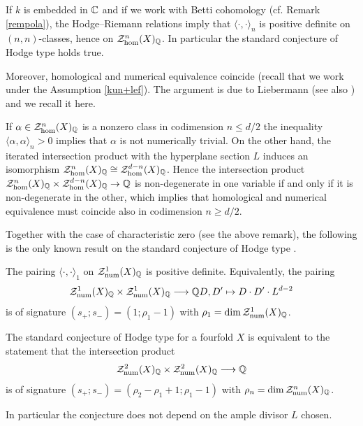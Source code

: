 \begin{remark}
\notready\label{remHR}
If $k$ is embedded in $\mathbb{C}$ and if we work with Betti cohomology (cf. Remark \ref{rempola}), the Hodge--Riemann relations imply that $\langle \cdot, \cdot \rangle_{n}$  is positive definite on $(n,n)$-classes, hence on $\mathcal{Z}_{\hom}^{n}(X)_{\mathbb{Q}}$. In particular the standard conjecture of Hodge type holds true.

Moreover, homological and numerical equivalence coincide (recall that we work under the Assumption  \ref{kun+lef}). The argument is due to Liebermann  \cite{Lieb} (see also \cite[Corollary 5.4.2.2]{Andmot}) and we recall it here.

If  $\alpha \in \mathcal{Z}_{\hom}^{n}(X)_{\mathbb{Q}}$ is a nonzero class  in codimension $n\leq d/2$ the inequality  $\langle \alpha, \alpha \rangle_{n}>0$ implies that $\alpha$ is not numerically trivial. On the other hand, the iterated intersection product with the hyperplane section $L$ induces an isomorphism $\mathcal{Z}_{\hom}^{n}(X)_{\mathbb{Q}}\cong \mathcal{Z}_{\hom}^{d-n}(X)_{\mathbb{Q}}$. Hence the intersection product $\mathcal{Z}_{\hom}^{n}(X)_{\mathbb{Q}}\times \mathcal{Z}_{\hom}^{d-n}(X)_{\mathbb{Q}}\rightarrow \mathbb{Q}$ is non-degenerate in one variable if and only if it is non-degenerate in the other, which implies that homological and numerical equivalence must coincide also in codimension $n\geq d/2$.

\end{remark}
Together with the case of characteristic zero (see the above remark), the following is the only known result on the standard conjecture of Hodge type \cite[5.3.2.3]{Andmot}.
\begin{theorem}
\notready
The pairing\label{segre} $\langle \cdot, \cdot \rangle_{1}$   on $\mathcal{Z}_{\mathrm{num}}^{1}(X)_{\mathbb{Q}}$ is positive definite. Equivalently, the pairing
\[\mathcal{Z}^1_{\mathrm{num}}(X)_{\mathbb{Q}}\times \mathcal{Z}_{\mathrm{num}}^1(X)_{\mathbb{Q}} \longrightarrow \mathbb{Q}  D,D' \mapsto D\cdot D' \cdot L^{d-2}\]
is of signature  $ (s_+;s_-) = (1;  \rho_1-1)$ with
 $\rho_1=\dim \mathcal{Z}_{\mathrm{num}}^1(X)_{\mathbb{Q}}$.
\end{theorem}
\begin{prop}
\notready\label{anypolarization}
The standard conjecture of Hodge type for a fourfold $X$  is equivalent to the statement that the intersection product
\[\mathcal{Z}^2_{\mathrm{num}}(X)_{\mathbb{Q}}\times \mathcal{Z}_{\mathrm{num}}^2(X)_{\mathbb{Q}} \longrightarrow \mathbb{Q}\]
is of signature  $ (s_+;s_-) = ( \rho_2 - \rho_1+1;  \rho_1-1)$ with
 $\rho_n=\dim \mathcal{Z}_{\mathrm{num}}^n(X)_{\mathbb{Q}}$.

In particular the conjecture does not depend on the ample divisor $L$ chosen.
\end{prop}

